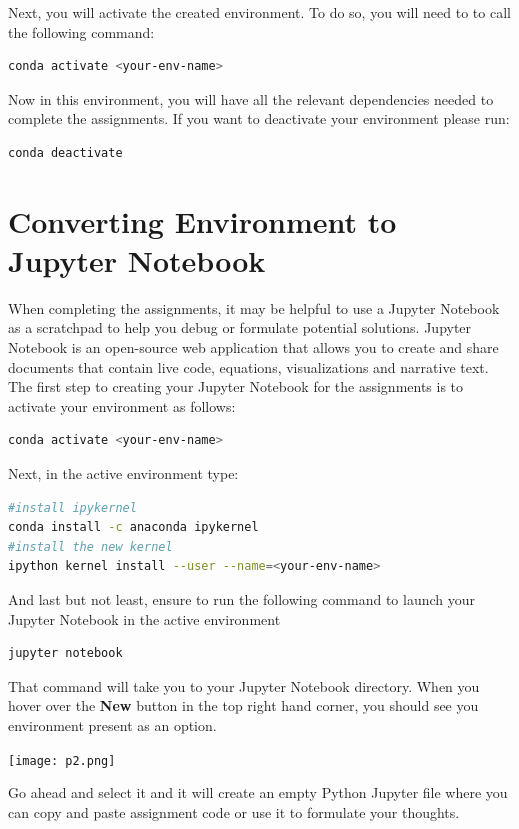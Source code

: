 \documentclass{article}
\begin{document}
Next, you will activate the created environment. To do so, you will need to to call the following command:
\begin{lstlisting}[language=bash]
conda activate <your-env-name>
\end{lstlisting}

Now in this environment, you will have all the relevant dependencies needed to complete the assignments. If you want to deactivate your environment please run:
\begin{lstlisting}[language=bash]
conda deactivate
\end{lstlisting}
 
\section{Converting Environment to Jupyter Notebook}
When completing the assignments, it may be helpful to use a Jupyter Notebook as a scratchpad to help you debug or formulate potential solutions. Jupyter Notebook is an open-source web application that allows you to create and share documents that contain live code, equations, visualizations and narrative text. The first step to creating your Jupyter Notebook for the assignments is to activate your environment as follows:
\begin{lstlisting}[language=bash]
conda activate <your-env-name>
\end{lstlisting}

Next, in the active environment type:
\begin{lstlisting}[language=bash]
#install ipykernel
conda install -c anaconda ipykernel
#install the new kernel
ipython kernel install --user --name=<your-env-name>
\end{lstlisting}

And last but not least, ensure to run the following command to launch your Jupyter Notebook in the active environment
\begin{lstlisting}[language=bash]
jupyter notebook
\end{lstlisting}

That command will take you to your Jupyter Notebook directory. When you hover over the \textbf{New} button in the top right hand corner, you should see you environment present as an option.
\begin{center}
   \texttt{[image: p2.png]} 
\end{center}
Go ahead and select it and it will create an empty Python Jupyter file where you can copy and paste assignment code or use it to formulate your thoughts. 
\end{document}
